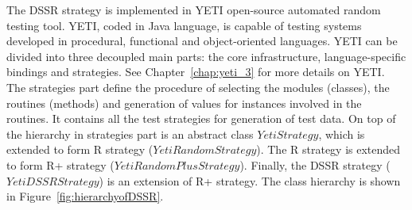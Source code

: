 The DSSR strategy is implemented in YETI open-source automated random testing tool. YETI, coded in Java language, is capable of testing systems developed in procedural, functional and object-oriented languages.
YETI can be divided into three decoupled main parts: the core infrastructure, language-specific bindings and strategies. See Chapter~\ref{chap:yeti_3} for more details on YETI. 
The strategies part define the procedure of selecting the modules (classes), the routines (methods) and generation of values for instances involved in the routines. It contains all the test strategies for generation of test data. On top of the hierarchy in strategies part is an abstract class $YetiStrategy$, which is extended to form R strategy ($YetiRandomStrategy$). The R strategy is extended to form R+ strategy ($YetiRandomPlusStrategy$). Finally, the DSSR strategy ($YetiDSSRStrategy$) is an extension of R+ strategy. The class hierarchy is shown in Figure~\ref{fig:hierarchyofDSSR}.


